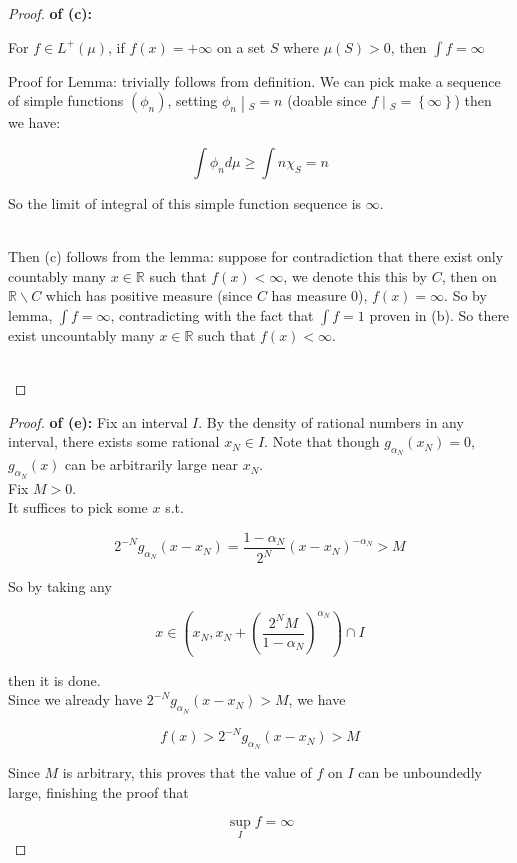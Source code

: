 \documentclass{qlnotes-export}
\begin{document}
\begin{proof}

\textbf{of (c):}

\begin{lemma}

For \(f \in L^{+}(\mu)\), if \(f(x) = + \infty\) on a set \(S\) where \(\mu(S) > 0\), then \(\int f = \infty\)

\end{lemma}

Proof for Lemma: trivially follows from definition. We can pick make a sequence of simple functions \((\phi_{n})\), setting \(\left. \phi_{n} \middle| {}_{S} = n \right.\) (doable since \(\left. f \middle| {}_{S} = \left\{ \infty \right\} \right.\)) then we have:

\[\int\phi_{n} d\mu \geq \int n\chi_{S} = n\]

So the limit of integral of this simple function sequence is \(\infty\).\\
\strut \\
Then (c) follows from the lemma: suppose for contradiction that there exist only countably many \(x \in {\mathbb{R}}\) such that \(f(x) < \infty\), we denote this this by \(C\), then on \({\mathbb{R}}\backslash C\) which has positive measure (since \(C\) has measure 0), \(f(x) = \infty\). So by lemma, \(\int f = \infty\), contradicting with the fact that \(\int f = 1\) proven in (b). So there exist uncountably many \(x \in {\mathbb{R}}\) such that \(f(x) < \infty\).\\
\strut \\

\end{proof}

\begin{proof}

\textbf{of (e):} Fix an interval \(I\). By the density of rational numbers in any interval, there exists some rational \(x_{N} \in I\). Note that though \(g_{\alpha_{N}}(x_{N}) = 0\), \(g_{\alpha_{N}}(x)\) can be arbitrarily large near \(x_{N}\).\\
Fix \(M > 0\).\\
It suffices to pick some \(x\) s.t.

\[2^{- N}g_{\alpha_{N}}(x - x_{N}) = \frac{1 - \alpha_{N}}{2^{N}}(x - x_{N})^{- \alpha_{N}} > M\]

So by taking any

\[x \in (x_{N},x_{N} + (\frac{2^{N}M}{1 - \alpha_{N}})^{\alpha_{N}}) \cap I\]

then it is done.\\
Since we already have \(2^{- N}g_{\alpha_{N}}(x - x_{N}) > M\), we have

\[f(x) > 2^{- N}g_{\alpha_{N}}(x - x_{N}) > M\]

Since \(M\) is arbitrary, this proves that the value of \(f\) on \(I\) can be unboundedly large, finishing the proof that

\[\sup\limits_{I}f = \infty\]

\end{proof}
\end{document}

